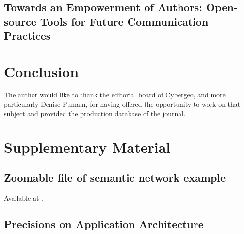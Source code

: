 \subsection*{Towards an Empowerment of Authors: Open-source Tools for Future Communication Practices}











\section*{Conclusion}
\label{sec:discussion}







\begin{acknowledgements}
The author would like to thank the editorial board of Cybergeo, and more particularly Denise Pumain, for having offered the opportunity to work on that subject and provided the production database of the journal. 
\end{acknowledgements}













\section*{Supplementary Material}

\subsection*{Zoomable file of semantic network example}

Available at \texttt{}.


\subsection*{Precisions on Application Architecture}








